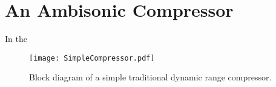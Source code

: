 \section{An Ambisonic Compressor}
\label{sec:ambis-compr}
In the 

\begin{figure*}
  \texttt{[image: SimpleCompressor.pdf]}
  \caption{Block diagram of a simple traditional dynamic range
    compressor.}
  \label{fig:comp-block}
\end{figure*}


